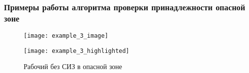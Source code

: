 \begin{frame}
    \frametitle{Примеры работы алгоритма проверки принадлежности опасной зоне}
    \begin{figure}
        \begin{minipage}[!h]{0.49\linewidth}
            \centering
            \texttt{[image: example\_3\_image]}
        \end{minipage}
        \hfill
        \begin{minipage}[!h]{0.49\linewidth}
            \centering
            \texttt{[image: example\_3\_highlighted]}
        \end{minipage}
        \caption{Рабочий без СИЗ в опасной зоне}
    \end{figure}
\end{frame}